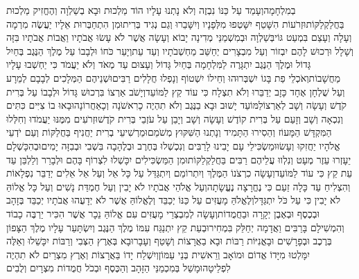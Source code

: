 \documentclass[../main/main.tex]{subfiles}
\begin{document}
\begin{multicols*}{\ncols}
בְמִלְחָמָה\PreVerseSpace{}וְעָמַד עַל כַּנּוֹ נִבְזֶה וְלֹא נָתְנוּ עָלָיו הוֹד מַלְכוּת וּבָא בְשַׁלְוָה וְהֶחֱזִיק מַלְכוּת בַּחֲלַקְלַקּוֹת\PreVerseSpace{}וּזְרֹעוֹת הִשָּׁטֵף\SubEnd{} יִשָּׁטְפוּ מִלְּפָנָיו וְיִשָּׁבֵרוּ וְגַם נְגִיד בְּרִית\PreVerseSpace{}וּמִן הִתְחַבְּרוּת אֵלָיו יַעֲשֶׂה מִרְמָה וְעָלָה וְעָצַם בִּמְעַט גּוֹי\PreVerseSpace{}בְּשַׁלְוָה וּבְמִשְׁמַנֵּי מְדִינָה יָבוֹא וְעָשָׂה אֲשֶׁר לֹא עָשׂוּ אֲבֹתָיו וַאֲבוֹת אֲבֹתָיו בִּזָּה וְשָׁלָל וּרְכוּשׁ לָהֶם יִבְזוֹר וְעַל מִבְצָרִים יְחַשֵּׁב מַחְשְׁבֹתָיו וְעַד עֵת\PreVerseSpace{}וְיָעֵר כֹּחוֹ וּלְבָבוֹ עַל מֶלֶךְ הַנֶּגֶב בְּחַיִל גָּדוֹל וּמֶלֶךְ הַנֶּגֶב יִתְגָּרֶה לַמִּלְחָמָה בְּחַיִל גָּדוֹל וְעָצוּם עַד מְאֹד וְלֹא יַעֲמֹד כִּי יַחְשְׁבוּ עָלָיו מַחֲשָׁבוֹת\PreVerseSpace{}וְאֹכְלֵי פַת בָּגוֹ יִשְׁבְּרוּהוּ וְחֵילוֹ יִשְׁטוֹף וְנָפְלוּ חֲלָלִים רַבִּים\PreVerseSpace{}וּשְׁנֵיהֶם הַמְּלָכִים לְבָבָם לְמֵרָע וְעַל שֻׁלְחָן אֶחָד כָּזָב יְדַבֵּרוּ וְלֹא תִצְלָח כִּי עוֹד קֵץ לַמּוֹעֵד\PreVerseSpace{}וְיָשֹׁב אַרְצוֹ בִּרְכוּשׁ גָּדוֹל וּלְבָבוֹ עַל בְּרִית קֹדֶשׁ וְעָשָׂה וְשָׁב לְאַרְצוֹ\PreVerseSpace{}לַמּוֹעֵד יָשׁוּב וּבָא בַנֶּגֶב וְלֹא תִהְיֶה כָרִאשֹׁנָה וְכָאַחֲרוֹנָה\PreVerseSpace{}וּבָאוּ בוֹ צִיִּים כִּתִּים וְנִכְאָה וְשָׁב וְזָעַם עַל בְּרִית קוֹדֶשׁ וְעָשָׂה וְשָׁב וְיָבֵן עַל עֹזְבֵי בְּרִית קֹדֶשׁ\PreVerseSpace{}וּזְרֹעִים מִמֶּנּוּ יַעֲמֹדוּ וְחִלְּלוּ הַמִּקְדָּשׁ הַמָּעוֹז וְהֵסִירוּ הַתָּמִיד וְנָתְנוּ הַשִּׁקּוּץ מְשֹׁמֵם\PreVerseSpace{}וּמַרְשִׁיעֵי בְרִית יַחֲנִיף בַּחֲלַקּוֹת וְעַם יֹדְעֵי אֱלֹהָיו יַחֲזִקוּ וְעָשׂוּ\PreVerseSpace{}וּמַשְׂכִּילֵי עָם יָבִינוּ לָרַבִּים וְנִכְשְׁלוּ בְּחֶרֶב וּבְלֶהָבָה בִּשְׁבִי וּבְבִזָּה יָמִים\PreVerseSpace{}וּבְהִכָּשְׁלָם יֵעָזְרוּ עֵזֶר מְעָט וְנִלְווּ עֲלֵיהֶם רַבִּים בַּחֲלַקְלַקּוֹת\PreVerseSpace{}וּמִן הַמַּשְׂכִּילִים יִכָּשְׁלוּ לִצְרוֹף בָּהֶם וּלְבָרֵר וְלַלְבֵּן עַד עֵת קֵץ כִּי עוֹד לַמּוֹעֵד\PreVerseSpace{}וְעָשָׂה כִרְצֹנוֹ הַמֶּלֶךְ וְיִתְרוֹמֵם וְיִתְגַּדֵּל עַל כָּל אֵל וְעַל אֵל אֵלִים יְדַבֵּר נִפְלָאוֹת וְהִצְלִיחַ עַד כָּלָה זַעַם כִּי נֶחֱרָצָה נֶעֱשָׂתָה\PreVerseSpace{}וְעַל אֱלֹהֵי אֲבֹתָיו לֹא יָבִין וְעַל חֶמְדַּת נָשִׁים וְעַל כָּל אֱלוֹהַּ לֹא יָבִין כִּי עַל כֹּל יִתְגַּדָּל\PreVerseSpace{}וְלֶאֱלֹהַּ מָעֻזִּים עַל כַּנּוֹ יְכַבֵּד וְלֶאֱלוֹהַּ אֲשֶׁר לֹא יְדָעֻהוּ אֲבֹתָיו יְכַבֵּד בְּזָהָב וּבְכֶסֶף וּבְאֶבֶן יְקָרָה וּבַחֲמֻדוֹת\PreVerseSpace{}וְעָשָׂה לְמִבְצְרֵי מָעֻזִּים עִם אֱלוֹהַּ נֵכָר אֲשֶׁר הִכִּיר יַרְבֶּה כָבוֹד וְהִמְשִׁילָם בָּרַבִּים וַאֲדָמָה יְחַלֵּק בִּמְחִיר\PreVerseSpace{}וּבְעֵת קֵץ יִתְנַגַּח עִמּוֹ מֶלֶךְ הַנֶּגֶב וְיִשְׂתָּעֵר עָלָיו מֶלֶךְ הַצָּפוֹן בְּרֶכֶב וּבְפָרָשִׁים וּבָאֳנִיּוֹת רַבּוֹת וּבָא בַאֲרָצוֹת וְשָׁטַף וְעָבָר\PreVerseSpace{}וּבָא בְּאֶרֶץ הַצְּבִי וְרַבּוֹת יִכָּשֵׁלוּ וְאֵלֶּה יִמָּלְטוּ מִיָּדוֹ אֱדוֹם וּמוֹאָב וְרֵאשִׁית בְּנֵי עַמּוֹן\PreVerseSpace{}וְיִשְׁלַח יָדוֹ בַּאֲרָצוֹת וְאֶרֶץ מִצְרַיִם לֹא תִהְיֶה לִפְלֵיטָה\PreVerseSpace{}וּמָשַׁל בְּמִכְמַנֵּי הַזָּהָב וְהַכֶּסֶף וּבְכֹל חֲמֻדוֹת מִצְרָיִם וְלֻבִים 
\end{multicols*}
\end{document}
